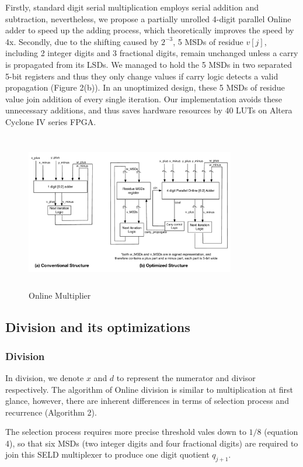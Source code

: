 \documentclass{sig-alternate}
\begin{document}
	Firstly, standard digit serial multiplication employs serial addition and subtraction, nevertheless, we propose a partially unrolled 4-digit parallel Online adder to speed up the adding process, which theoretically improves the speed by 4x. Secondly, due to the shifting caused by $2^{-3}$, 5 MSDs of residue $v[j]$, including 2 integer digits and 3 fractional digits, remain unchanged unless a carry is propagated from its LSDs. We managed to hold the 5 MSDs in two separated 5-bit registers and thus they only change values if carry logic detects a valid propagation (Figure 2(b)). In an unoptimized design, these 5 MSDs of residue value join addition of every single iteration. Our implementation avoids these unnecessary additions, and thus saves hardware resources by 40 LUTs on Altera Cyclone IV series FPGA.     
	\begin{figure} [ht]
		\centering
		\includegraphics[height=2.7in,width=3.6in]{dividing_upper_block}
		\caption{Online Multiplier}
	\end{figure}
	\newpage
	
	\subsection{Division and its optimizations}
	\subsubsection{Division}
	In division, we denote $x$ and $d$ to represent the numerator and divisor respectively. The algorithm of Online division is similar to multiplication at first glance, however, there are inherent differences in terms of selection process and recurrence (Algorithm 2).
	
	
	 The selection process requires more precise threshold vales down to $1/8$ (equation 4), so that six MSDs (two integer digits and four fractional digits) are required to join this SELD multiplexer to produce one digit quotient $q_{j+1}$.  
\end{document}
